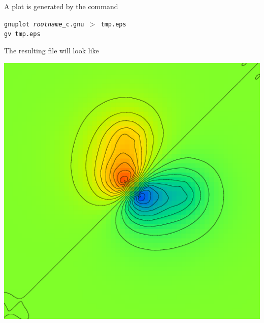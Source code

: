\documentclass[final,12pt,makeidx,DIV=calc]{article}
\begin{document}
{{{{{{A plot is generated by the command
\begin{center}
\begin{minipage}{0.7\linewidth}
{\tt gnuplot {\it rootname}\_c.gnu $>$ tmp.eps}\\
{\tt gv tmp.eps}
\end{minipage}
\end{center}

The resulting file will look like
\begin{center}
\includegraphics[width=0.5\linewidth,clip=true]{Figs/gnucontour.eps}
\end{center}


}}}}}}
\end{document}
